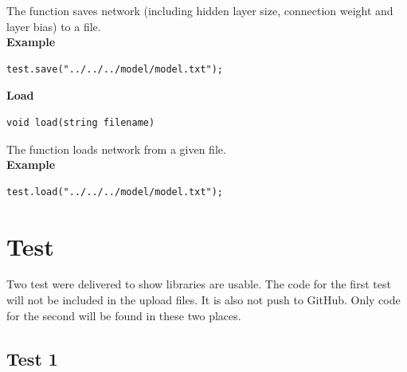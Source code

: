 \documentclass[a4paper]{article}
\begin{document}
The function saves network (including hidden layer size, connection weight and layer bias) to a file.\\
\textbf{Example}
\begin{lstlisting}[language={[ANSI]C++},keywordstyle=\color{blue!70},commentstyle=\color{red!50!green!50!blue!50},frame=shadowbox, rulesepcolor=\color{red!20!green!20!blue!20}]
test.save("../../../model/model.txt");
\end{lstlisting}
\textbf{\Large Load}
\begin{lstlisting}[language={[ANSI]C++},keywordstyle=\color{blue!70},commentstyle=\color{red!50!green!50!blue!50},frame=shadowbox, rulesepcolor=\color{red!20!green!20!blue!20}]
void load(string filename)
\end{lstlisting}

The function loads network from a given file.\\
\textbf{Example}
\begin{lstlisting}[language={[ANSI]C++},keywordstyle=\color{blue!70},commentstyle=\color{red!50!green!50!blue!50},frame=shadowbox, rulesepcolor=\color{red!20!green!20!blue!20}]
test.load("../../../model/model.txt");
\end{lstlisting}
\section{Test}
Two test were delivered to show libraries are usable. The code for the first test will not be included in the upload files. It is also not push to GitHub. Only code for the second will be found in these two places. 
\subsection{Test 1}
\end{document}
